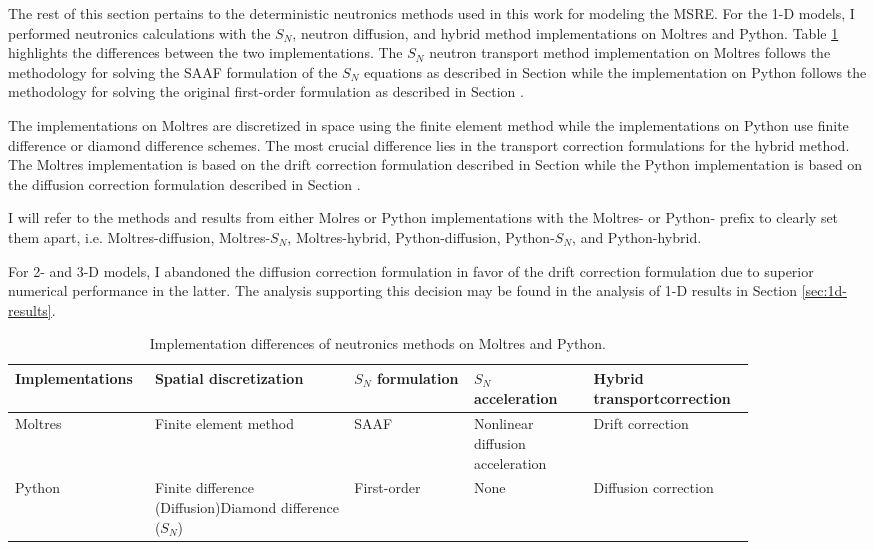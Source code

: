 The rest of this section pertains to the deterministic neutronics methods used in this work for
modeling the \gls{MSRE}.
For the 1-D models, I performed neutronics calculations with the $S_N$, neutron diffusion, and
hybrid method implementations on Moltres and Python. Table \ref{table:nts-methods} highlights the
differences between the two implementations. The $S_N$ neutron transport method implementation on
Moltres follows the methodology for solving the \gls{SAAF} formulation of the $S_N$ equations as
described in Section \label{sec:saaf} while the implementation on Python follows the methodology
for solving the original first-order formulation as described in Section \label{sec:python-sn}.

The implementations on Moltres are discretized in space using the finite element method
while the implementations on Python use finite difference or diamond difference schemes. The most
crucial difference lies in the transport correction formulations for the hybrid method. The Moltres
implementation is based on the drift correction formulation described in Section
\label{sec:drift-correction} while the Python implementation is based on the diffusion correction
formulation described in Section \label{sec:diffusion-correction}.

I will refer to the methods and results from either Molres or Python implementations with the
Moltres- or Python- prefix to clearly set them apart, i.e. Moltres-diffusion, Moltres-$S_N$,
Moltres-hybrid, Python-diffusion, Python-$S_N$, and Python-hybrid.

For 2- and 3-D models, I abandoned the diffusion correction formulation in favor of the drift
correction formulation due to superior numerical performance in the latter. The analysis
supporting this decision may be found in the analysis of 1-D results in Section
\ref{sec:1d-results}.

\begin{table}[htb!]
  \centering
  \footnotesize
  \caption{Implementation differences of neutronics methods on Moltres and Python.}
  \begin{tabular}{p{0.14\linewidth} p{0.25\linewidth} p{0.15\linewidth} p{0.15\linewidth} p{0.17\linewidth}}
    \toprule
    Implementations & Spatial discretization & $S_N$ formulation & $S_N$ acceleration &
    Hybrid transport\newline correction \\
    \midrule
    Moltres & Finite element method & SAAF & Nonlinear diffusion acceleration & Drift correction \\
    Python & Finite difference (Diffusion)\newline Diamond difference ($S_N$) & First-order & None & Diffusion correction \\
    \bottomrule
  \end{tabular}
  \label{table:nts-methods}
\end{table}

